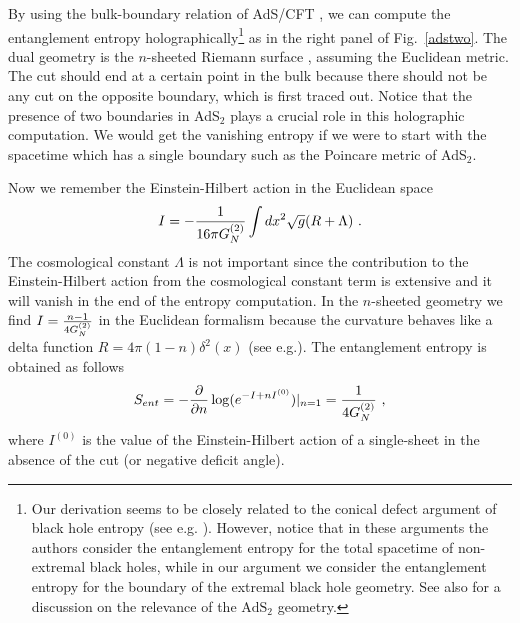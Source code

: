 \documentclass[12pt]{article}
\def\frac#1#2{{#1\over #2}}
\def\s{\sqrt}
\def\de{\partial}
\def\f {\frac}
\def\frac#1#2{{#1\over #2}}
\def\s{\sqrt}
\begin{document}
By using the bulk-boundary relation of AdS/CFT \cite{ADSGKP,ADSWitten}, we can
compute the entanglement entropy holographically\footnote{
Our derivation seems to be closely related to the conical defect argument of black hole entropy
(see e.g. \cite{Jacobson:1994iw,FursaevR}). However, notice that in these arguments the authors consider
the entanglement entropy for the total spacetime of
non-extremal black holes, while in our argument we consider the
entanglement entropy for the boundary of the extremal black
hole geometry. See also \cite{Carroll:2009ma} for a discussion on the relevance of the
$\mathrm{AdS}_2$
geometry.} as in the right panel of
Fig.\ \ref{adstwo}. The dual geometry is the $n$-sheeted
Riemann surface \cite{RuTa,RuTaL}, assuming the Euclidean metric.
The cut should end at
a certain point in the bulk
because there should not be any cut on the opposite boundary, which
is first traced out. Notice that the presence of two boundaries in
AdS$_2$ plays a crucial role in this holographic computation. We
would get the vanishing entropy if we were to start with the
spacetime which has a single boundary such as the Poincare metric of
AdS$_2$.

Now we remember the Einstein-Hilbert action in the Euclidean space
\begin{align}
 I =-\f{1}{16\pi G^{(2)}_N}\int dx^2 \s{g}(R+\Lambda) \ .
\end{align}
The cosmological constant $\Lambda$ is not important since
the contribution to the Einstein-Hilbert action
from the cosmological constant term is
extensive and it will vanish in the end of the entropy computation.
In the $n$-sheeted geometry we find $I=\f{n-1}{4G^{(2)}_N}$ in
the Euclidean formalism because the curvature behaves like a delta
function $R=4\pi (1-n)\delta^2(x)$ (see e.g.\cite{Fursaev:2006ih,FursaevR}). The
entanglement entropy is obtained as follows
\begin{align}
 S_{ent}=-\f{\de}{\de n}\log ( e^{-I + nI^{(0)}}
)|_{n=1} =\f{1}{4G^{(2)}_N} \ ,
\end{align}
where $I^{(0)}$ is the value of the Einstein-Hilbert action of a
single-sheet in the absence of the cut (or negative deficit angle).
\end{document}
